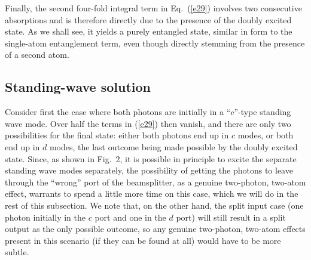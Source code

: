 \documentclass[aps,pra,twocolumn,floatfix,superscriptaddress]{revtex4}
\begin{document}
Finally, the second four-fold integral term in Eq.~(\ref{e29}) involves two consecutive absorptions and is therefore directly due to the presence of the doubly excited state.  As we shall see, it yields a purely entangled state, similar in form to the single-atom entanglement term, even though directly stemming from the presence of a second atom.

\subsection{Standing-wave solution}

Consider first the case where both photons are initially in a ``$c$''-type standing wave mode. Over half the terms in (\ref{e29}) then vanish, and there are only two possibilities for the final state: either both photons end up in $c$ modes, or both end up in $d$ modes, the last outcome being made possible by the doubly excited state.  Since, as shown in Fig.~2, it is possible in principle to excite the separate standing wave modes separately, the possibility of getting the photons to leave through the ``wrong'' port of the beamsplitter, as a genuine two-photon, two-atom effect, warrants to spend a little more time on this case, which we will do in the rest of this subsection. 
We note that, on the other hand, the split input case (one photon initially in the $c$ port and one in the $d$ port) will still result in a split output as the only possible outcome, so any genuine two-photon, two-atom effects present in this scenario (if they can be found at all) would have to be more subtle.
\end{document}
